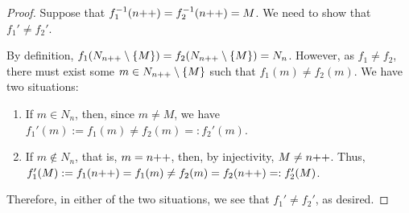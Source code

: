 \begin{proof}
	Suppose that $f_1^{-1}(n{+}{+}) = f_2^{-1}(n{+}{+}) = M$. We need to show that $f_1' \ne f_2'$. 

	By definition, $f_1(N_{n{+}{+}} \setminus \{M\}) = f_2(N_{n{+}{+}} \setminus \{M\}) = N_n$. However, as $f_1 \ne f_2$, there must exist some $m \in N_{n{+}{+}} \setminus \{M\}$ such that $f_1(m) \ne f_2(m)$. We have two situations:
	\begin{enumerate}
		\item 
		If $m \in N_n$, then, since $m \ne M$, we have $f_1'(m) := f_1(m) \ne f_2(m) =: f_2'(m) $.

		\item
		If $m \notin N_n$, that is, $m = n{+}{+}$, then, by injectivity, $M \ne n{+}{+}$. Thus, $f_1'(M) := f_1(n{+}{+}) = f_1(m) \ne f_2(m) = f_2(n{+}{+}) =: f_2'(M)$.
	\end{enumerate}

	Therefore, in either of the two situations, we see that $f_1' \ne f_2'$, as desired.
\end{proof}

